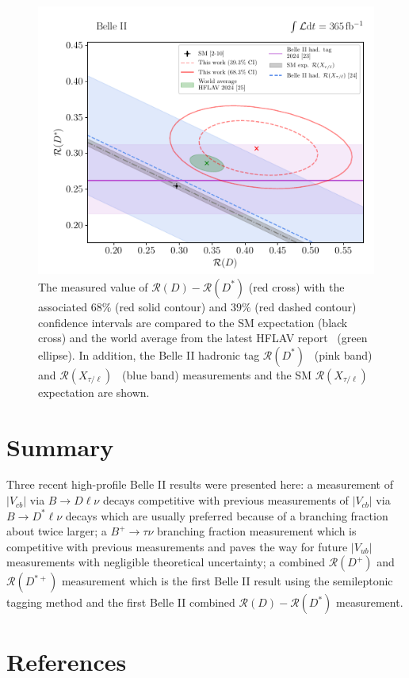\documentclass{moriond}
\def\vub{V_{ub}}
\def\vcb{V_{cb}}
\def\btodlnu{B \to D\ell\nu}
\def\btodstlnu{B \to D^*\ell\nu}
\def\rd{\mathcal{R}\left(D\right)}
\def\rdp{\mathcal{R}\left(D^+\right)}
\def\rdst{\mathcal{R}\left(D^*\right)}
\def\rdstp{\mathcal{R}\left(D^{*+}\right)}
\begin{document}
\begin{figure}[h!]
    \centering
    \includegraphics[scale=0.9]{rd_comp.pdf}
    \caption{The measured value of $\rd-\rdst$ (red cross) with the associated $68\%$ (red solid contour) and $39\%$ (red dashed contour) confidence intervals are compared to the SM expectation (black cross) and the world average from the latest HFLAV report~\cite{hflav} (green ellipse). In addition, the Belle II hadronic tag $\rdst$~\cite{kojima} (pink band) and $\mathcal{R}(X_{\tau/\ell})$~\cite{henrik} (blue band) measurements and the SM $\mathcal{R}(X_{\tau/\ell})$ expectation are shown.}
    \label{fig:rd_comp}
\end{figure}

\section{Summary}
Three recent high-profile Belle II results were presented here: a measurement of $|\vcb|$ via $\btodlnu$ decays competitive with previous measurements of $|\vcb|$ via $\btodstlnu$ decays which are usually preferred because of a branching fraction about twice larger; a $B^+ \to \tau\nu$ branching fraction measurement which is competitive with previous measurements and paves the way for future $|\vub|$ measurements with negligible theoretical uncertainty; a combined $\rdp$ and $\rdstp$ measurement which is the first Belle II result using the semileptonic tagging method and the first Belle II combined $\rd-\rdst$ measurement.


\section*{References}
\end{document}
